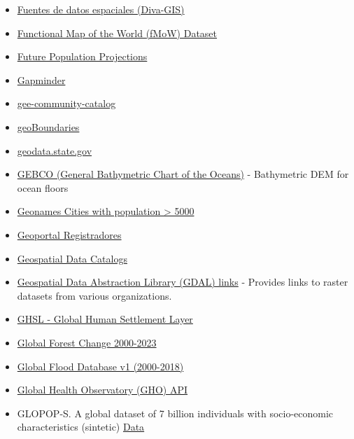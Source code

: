 \documentclass[
  letterpaper,
  DIV=11,
  numbers=noendperiod]{scrartcl}
\begin{document}
\begin{itemize}
{  Ecoregions of the World}
\item
  \href{https://diva-gis.org/}{Fuentes de datos espaciales (Diva-GIS)}
\item
  \href{https://github.com/fMoW/dataset}{Functional Map of the World
  (fMoW) Dataset}
\item
  \href{https://hub.worldpop.org/doi/10.5258/SOTON/WP00849}{Future
  Population Projections}
\item
  \href{https://www.gapminder.org/data/}{Gapminder}
\item
  \href{https://gee-community-catalog.org/}{gee-community-catalog}
\item
  \href{https://www.geoboundaries.org/}{geoBoundaries}
\item
  \href{https://geodata.state.gov/geonetwork/srv/spa/catalog.search\#/home}{geodata.state.gov}
\item
  \href{https://www.gebco.net/}{GEBCO (General Bathymetric Chart of the
  Oceans)} - Bathymetric DEM for ocean floors
\item
  \href{https://documentation-resources.opendatasoft.com/explore/dataset/doc-geonames-cities-5000/table/}{Geonames
  Cities with population \textgreater{} 5000}
\item
  \href{https://geoportal.registradores.org/}{Geoportal Registradores}
\item
  \href{https://github.com/opengeos/geospatial-data-catalogs}{Geospatial
  Data Catalogs}
\item
  \href{https://gdal.org/en/stable/}{Geospatial Data Abstraction Library
  (GDAL) links} - Provides links to raster datasets from various
  organizations.
\item
  \href{https://human-settlement.emergency.copernicus.eu/download.php?ds=bu}{GHSL
  - Global Human Settlement Layer}
\item
  \href{https://storage.googleapis.com/earthenginepartners-hansen/GFC-2023-v1.11/download.html}{Global
  Forest Change 2000-2023}
\item
  \href{https://developers.google.com/earth-engine/datasets/catalog/GLOBAL_FLOOD_DB_MODIS_EVENTS_V1}{Global
  Flood Database v1 (2000-2018)}
\item
  \href{https://www.who.int/data/gho/info/gho-odata-api}{Global Health
  Observatory (GHO) API}
\item
  GLOPOP-S. A global dataset of 7 billion individuals with
  socio-economic characteristics (sintetic)
  \href{https://dataverse.harvard.edu/dataset.xhtml?persistentId=doi:10.7910/DVN/KJC3RH}{Data}

\end{itemize}
\end{document}
